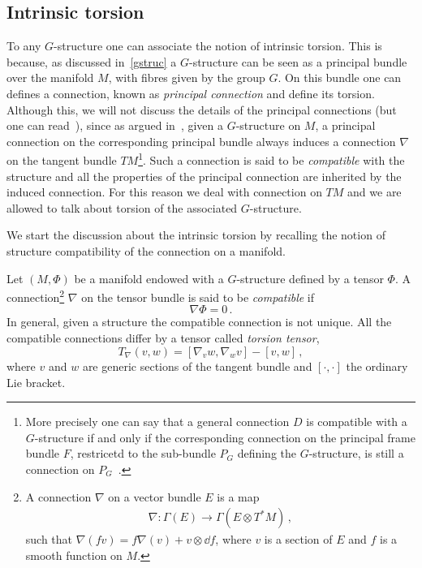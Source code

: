 \documentclass[debug]{phd}
\begin{document}
			\subsection{Intrinsic torsion}
					To any $G$-structure one can associate the notion of intrinsic torsion.
					This is because, as discussed in~\cref{gstruc} a $G$-structure can be seen as a principal bundle over the manifold $M$, with fibres given by the group $G$.
					On this bundle one can defines a connection, known as \emph{principal connection} and define its torsion.
					Although this, we will not discuss the details of the principal connections (but one can read~\cite{koba, topofibre}), since as argued in~\cite{joyce}, given a $G$-structure on $M$, a principal connection on the corresponding principal bundle always induces a connection $\nabla$ on the tangent bundle $TM$\footnote{%
						More precisely one can say that a general connection $D$ is compatible with a $G$-structure if and only if the corresponding connection on the principal frame bundle $F$, restricetd to the sub-bundle $P_G$ defining the $G$-structure, is still a connection on $P_G$~\cite{koba}.
						}.
					Such a connection is said to be \emph{compatible} with the structure and all the properties of the principal connection are inherited by the induced connection.
					For this reason we deal with connection on $TM$ and we are allowed to talk about torsion of the associated $G$-structure.
					
					We start the discussion about the intrinsic torsion by recalling the notion of structure compatibility of the connection on a manifold.
					
					Let $(M,\Phi)$ be a manifold endowed with a $G$-structure defined by a tensor $\Phi$. A connection\footnote{%
						A connection $\nabla$ on a vector bundle $E$ is a map
								\begin{align*}
									\nabla : \Gamma\left(E\right) \rightarrow \Gamma\left(E \otimes T^*M \right)\, ,
								\end{align*}
						such that $\nabla(f v) = f \nabla(v) + v \otimes \dd f$, where $v$ is a section of $E$ and $f$ is a smooth function on $M$.%
						}	
					$\nabla$ on the tensor bundle is said to be \emph{compatible} if
							\begin{equation}
								\nabla \Phi = 0 \, .
							\end{equation}
					In general, given a structure the compatible connection is not unique.
					All the compatible connections differ by a tensor called \emph{torsion tensor},
							\begin{equation}\label{torsmap}
								T_{\nabla} (v,w) = \left[\nabla_v w , \nabla_w v \right] - \left[v , w \right]\, ,
							\end{equation}
					where $v$ and $w$ are generic sections of the tangent bundle and $[ \cdot, \cdot]$ the ordinary Lie bracket.
					
\end{document}
